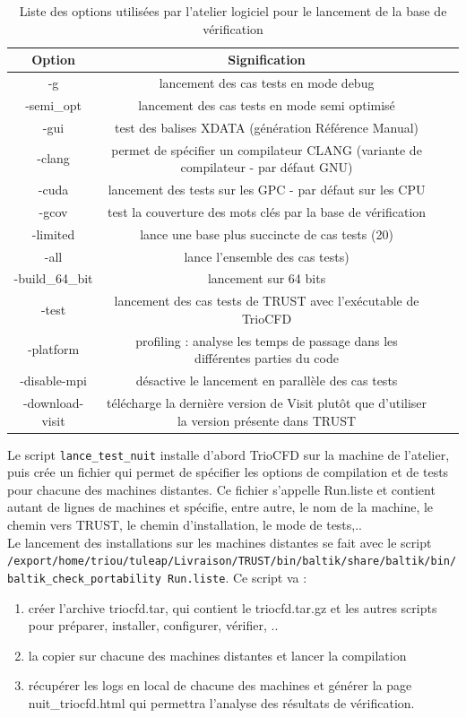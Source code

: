 \begin{table}[H]
\begin{centering}
\footnotesize
\begin{tabular}{Sc Sc}
\hline\hline
{}\textbf{Option} & \textbf{Signification}  \tabularnewline
\hline
-g & lancement des cas tests en mode debug \tabularnewline \hline
-semi\_opt & lancement des cas tests en mode semi optimisé \tabularnewline \hline
-gui & test des balises XDATA (génération Référence Manual) \tabularnewline \hline
-clang & permet de spécifier un compilateur CLANG (variante de compilateur - par défaut GNU) \tabularnewline \hline
-cuda & lancement des tests sur les GPC - par défaut sur les CPU \tabularnewline \hline
-gcov & test la couverture des mots clés par la base de vérification \tabularnewline \hline
-limited & lance une base plus succincte de cas tests (20)\tabularnewline \hline 
-all & lance l'ensemble des cas tests)\tabularnewline \hline
-build\_64\_bit & lancement sur 64 bits \tabularnewline \hline 
-test & lancement des cas tests de TRUST avec l'exécutable de TrioCFD \tabularnewline \hline
-platform & profiling : analyse les temps de passage dans les différentes parties du code \tabularnewline \hline
-disable-mpi & désactive le lancement en parallèle des cas tests \tabularnewline \hline
-download-visit & télécharge la dernière version de Visit plutôt que d'utiliser la version présente dans TRUST  \tabularnewline 
\hline\hline
\end{tabular}
\normalsize
\par\end{centering}
\caption{\label{tab:options-verif}Liste des options utilisées par l'atelier logiciel pour le lancement de la base de vérification}
\end{table}

Le script \texttt{lance\_test\_nuit} installe d'abord TrioCFD sur la machine de l'atelier, puis crée un fichier qui permet de spécifier les options de compilation et de tests pour chacune des machines distantes. Ce fichier s'appelle Run.liste et contient autant de lignes de machines et spécifie, entre autre, le nom de la machine, le chemin vers TRUST, le chemin d'installation, le mode de tests,..\\
Le lancement des installations sur les machines distantes se fait avec le script \texttt{/export/home/\-triou/tuleap/Livraison/TRUST/bin/baltik/share/baltik/bin/baltik\_check\_portability Run.liste}. Ce script va :
\begin{enumerate}
\item créer l'archive triocfd.tar, qui contient le triocfd.tar.gz et les autres scripts pour préparer, installer, configurer, vérifier, ..
\item la copier sur chacune des machines distantes et lancer la compilation
\item récupérer les logs en local de chacune des machines et générer la page nuit\_triocfd.html qui permettra l'analyse des résultats de vérification.
\end{enumerate}


